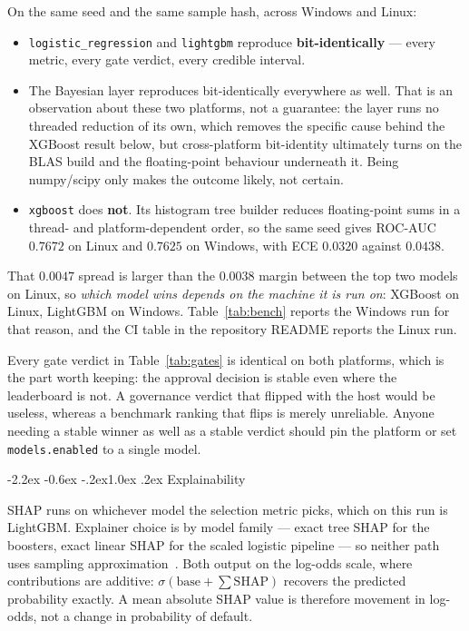 \documentclass[10pt,a4paper]{article}
\makeatletter
\renewcommand\section{\@startsection{section}{1}{\z@}%
  {-2.2ex \@plus -0.6ex \@minus -.2ex}{1.0ex \@plus .2ex}%
  {\normalfont\large\bfseries}}
\newcommand{\code}[1]{\texttt{\small #1}}
\makeatother
\begin{document}
On the same seed and the same sample hash, across Windows and Linux:

\begin{itemize}
\itemsep0.15em
\item \code{logistic\_regression} and \code{lightgbm} reproduce
      \textbf{bit-identically} --- every metric, every gate verdict, every
      credible interval.
\item The Bayesian layer reproduces bit-identically everywhere as well. That is an
      observation about these two platforms, not a guarantee: the layer runs no
      threaded reduction of its own, which removes the specific cause behind the
      XGBoost result below, but cross-platform bit-identity ultimately turns on the
      BLAS build and the floating-point behaviour underneath it. Being numpy/scipy
      only makes the outcome likely, not certain.
\item \code{xgboost} does \textbf{not}. Its histogram tree builder reduces
      floating-point sums in a thread- and platform-dependent order, so the same
      seed gives ROC-AUC $0.7672$ on Linux and $0.7625$ on Windows, with ECE
      $0.0320$ against $0.0438$.
\end{itemize}

That $0.0047$ spread is larger than the $0.0038$ margin between the top two
models on Linux, so \emph{which model wins depends on the machine it is run on}:
XGBoost on Linux, LightGBM on Windows. Table~\ref{tab:bench} reports the Windows
run for that reason, and the CI table in the repository README reports the Linux
run.

Every gate verdict in Table~\ref{tab:gates} is identical on both platforms,
which is the part worth keeping: the approval decision is stable even where the
leaderboard is not. A governance verdict that flipped with the host would be
useless, whereas a benchmark ranking that flips is merely unreliable. Anyone
needing a stable winner as well as a stable verdict should pin the platform or
set \code{models.enabled} to a single model.

\section{Explainability}
\label{sec:shap}

SHAP runs on whichever model the selection metric picks, which on this run is
LightGBM. Explainer choice is by model family --- exact tree SHAP for the
boosters, exact linear SHAP for the scaled logistic pipeline --- so neither path
uses sampling approximation~\cite{lundberg2017}. Both output on the log-odds
scale, where contributions are additive: $\sigma(\text{base} + \sum
\text{SHAP})$ recovers the predicted probability exactly. A mean absolute SHAP
value is therefore movement in log-odds, not a change in probability of default.
\end{document}
